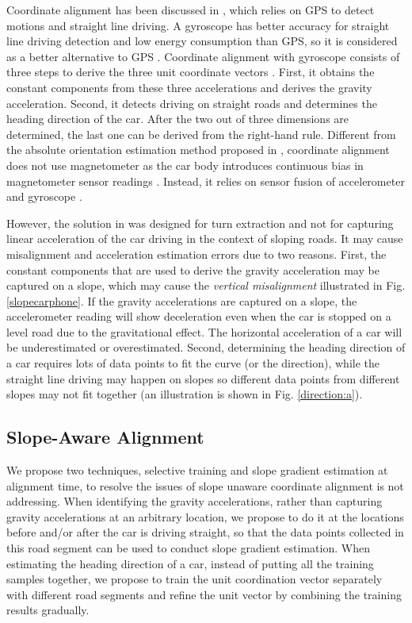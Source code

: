 Coordinate alignment has been discussed in \cite{Mohan2008Nericell}, 
which relies on GPS to detect motions and straight line driving. 
A gyroscope has better accuracy for straight line driving detection
and low energy consumption than GPS,
so it is considered as a better alternative to GPS \cite{wang2013sensing}.
Coordinate alignment with gyroscope consists of three steps to derive the three 
unit coordinate vectors \cite{wang2013sensing}.
First, it obtains the constant components from these three accelerations
and derives the gravity acceleration. 
Second, it detects driving on straight roads and determines the 
heading direction of the car.
After the two out of three dimensions are determined, 
the last one can be derived from the right-hand rule.
Different from the absolute orientation estimation method proposed in \cite{zhou2014use}, 
coordinate alignment does not use magnetometer as 
the car body introduces continuous bias 
in magnetometer sensor readings \cite{wang2015determining}. 
Instead, it relies on sensor fusion of accelerometer and gyroscope \cite{wang2013sensing}. 




However, the solution in \cite{wang2013sensing} was designed for turn extraction
and not for capturing linear acceleration of the car driving in the context of sloping roads. 
It may cause misalignment and acceleration estimation errors 
due to two reasons.  
First, the constant components that are used to derive the gravity acceleration 
may be captured on a slope, which may cause the \emph{vertical misalignment} illustrated 
in Fig. \ref{slopecarphone}.
If the gravity accelerations are captured on a slope,
the accelerometer reading will show deceleration even when the car is stopped on a level road due to the gravitational effect.
The horizontal acceleration of a car will be underestimated or overestimated.
Second, determining the heading direction of a car requires 
lots of data points to fit the curve (or the direction), 
while the straight line driving may happen on slopes so different data points
from different slopes may not fit together (an illustration is shown in Fig. \ref{direction:a}).

\subsection{Slope-Aware Alignment}

We propose two techniques, selective training and slope gradient estimation at alignment time,
to resolve the issues of slope unaware coordinate alignment is not addressing.
When identifying the gravity accelerations, 
rather than capturing gravity accelerations at an arbitrary location, 
we propose to do it at the locations before and/or after 
the car is driving straight,
so that the data points collected in this road segment 
can be used to conduct slope gradient estimation.
When estimating the heading direction of a car, 
instead of putting all the training samples together, 
we propose to train the unit coordination vector separately 
with different road segments and refine the 
unit vector by combining the training results gradually.
  


